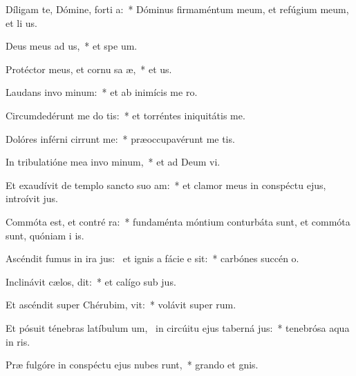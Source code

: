 \item Díligam te, Dómine, forti a:~* Dóminus firmaméntum meum, et refúgium meum, et li us.
\item Deus meus ad us,~* et spe  um.
\item Protéctor meus, et cornu sa æ,~* et  us.
\item Laudans invo minum:~* et ab inimícis me  ro.
\item Circumdedérunt me do tis:~* et torréntes iniquitátis  me.
\item Dolóres inférni cirrunt me:~* præoccupavérunt me  tis.
\item In tribulatióne mea invo minum,~* et ad Deum  vi.
\item Et exaudívit de templo sancto suo  am:~* et clamor meus in conspéctu ejus, introívit   jus.
\item Commóta est, et contré ra:~* fundaménta móntium conturbáta sunt, et commóta sunt, quóniam i  is.
\item Ascéndit fumus in ira jus:~\pscross{} et ignis a fácie e sit:~* carbónes succén   o.
\item Inclinávit cælos,  dit:~* et calígo sub  jus.
\item Et ascéndit super Chérubim,  vit:~* volávit super  rum.
\item Et pósuit ténebras latíbulum um,~\pscross{} in circúitu ejus taberná jus:~* tenebrósa aqua in  ris.
\item Præ fulgóre in conspéctu ejus nubes runt,~* grando et  gnis.
